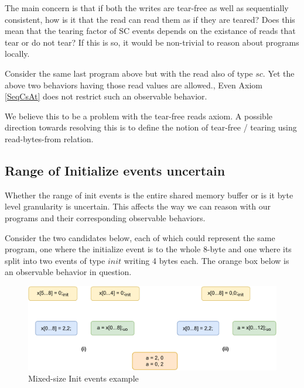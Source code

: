         The main concern is that if both the writes are tear-free as well as sequentially consistent, how is it that the read can read them as if they are teared?
        Does this mean that the tearing factor of SC events depends on the existance of reads that tear or do not tear? 
        If this is so, it would be non-trivial to reason about programs locally.
       
        Consider the same last program above but with the read also of type $sc$. 
        Yet the above two behaviors having those read values are allowed.,
        Even Axiom \ref{SeqCsAt} does not restrict such an observable behavior.

        We believe this to be a problem with the tear-free reads axiom.
        A possible direction towards resolving this is to define the notion of tear-free / tearing using read-bytes-from relation. 

    \subsection{Range of Initialize events uncertain}

        Whether the range of init events is the entire shared memory buffer or is it byte level granularity is uncertain.
        This affects the way we can reason with our programs and their corresponding observable behaviors.

        Consider the two candidates below, each of which could represent the same program, one where the initialize event is to the whole 8-byte and one where its split into two events of type $init$ writing 4 bytes each.
        The orange box below is an observable behavior in question.

        \begin{figure}[H]
            \centering
            \includegraphics[scale=0.7]{7.ConclusionFutureWork/InitExample.pdf}
            \caption{Mixed-size Init events example}
        \end{figure}

